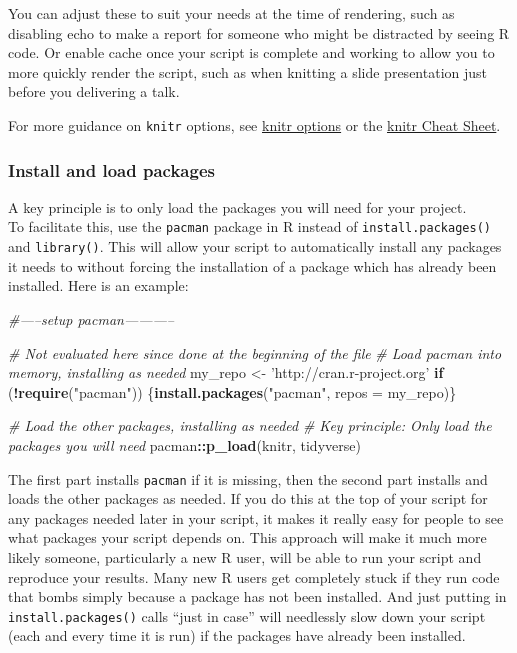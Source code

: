 \documentclass[
]{article}
\newenvironment{Shaded}{\begin{snugshade}}{\end{snugshade}}
\newcommand{\CommentTok}[1]{\textcolor[rgb]{0.56,0.35,0.01}{\textit{#1}}}
\newcommand{\ControlFlowTok}[1]{\textcolor[rgb]{0.13,0.29,0.53}{\textbf{#1}}}
\newcommand{\DataTypeTok}[1]{\textcolor[rgb]{0.13,0.29,0.53}{#1}}
\newcommand{\KeywordTok}[1]{\textcolor[rgb]{0.13,0.29,0.53}{\textbf{#1}}}
\newcommand{\NormalTok}[1]{#1}
\newcommand{\OperatorTok}[1]{\textcolor[rgb]{0.81,0.36,0.00}{\textbf{#1}}}
\newcommand{\StringTok}[1]{\textcolor[rgb]{0.31,0.60,0.02}{#1}}
\begin{document}
You can adjust these to suit your needs at the time of rendering, such
as disabling echo to make a report for someone who might be distracted
by seeing R code. Or enable cache once your script is complete and
working to allow you to more quickly render the script, such as when
knitting a slide presentation just before you delivering a talk.

For more guidance on \texttt{knitr} options, see
\href{https://yihui.name/knitr/options/}{knitr options} or the
\href{https://cran.r-project.org/web/packages/knitr/vignettes/knitr-refcard.pdf}{knitr
Cheat Sheet}.

\hypertarget{install-and-load-packages}{%
\subsubsection{Install and load
packages}\label{install-and-load-packages}}

A key principle is to only load the packages you will need for your
project.\\
To facilitate this, use the \texttt{pacman} package in R instead of
\texttt{install.packages()} and \texttt{library()}. This will allow your
script to automatically install any packages it needs to without forcing
the installation of a package which has already been installed. Here is
an example:

\begin{Shaded}
\begin{Highlighting}[]
\CommentTok{#-----setup pacman-----------}

\CommentTok{# Not evaluated here since done at the beginning of the file}
\CommentTok{# Load pacman into memory, installing as needed}
\NormalTok{my_repo <-}\StringTok{ 'http://cran.r-project.org'}
\ControlFlowTok{if}\NormalTok{ (}\OperatorTok{!}\KeywordTok{require}\NormalTok{(}\StringTok{"pacman"}\NormalTok{)) \{}\KeywordTok{install.packages}\NormalTok{(}\StringTok{"pacman"}\NormalTok{, }\DataTypeTok{repos =}\NormalTok{ my_repo)\}}

\CommentTok{# Load the other packages, installing as needed}
\CommentTok{# Key principle:  Only load the packages you will need}
\NormalTok{pacman}\OperatorTok{::}\KeywordTok{p_load}\NormalTok{(knitr, tidyverse)}
\end{Highlighting}
\end{Shaded}

The first part installs \texttt{pacman} if it is missing, then the
second part installs and loads the other packages as needed. If you do
this at the top of your script for any packages needed later in your
script, it makes it really easy for people to see what packages your
script depends on. This approach will make it much more likely someone,
particularly a new R user, will be able to run your script and reproduce
your results. Many new R users get completely stuck if they run code
that bombs simply because a package has not been installed. And just
putting in \texttt{install.packages()} calls ``just in case'' will
needlessly slow down your script (each and every time it is run) if the
packages have already been installed.
\end{document}
